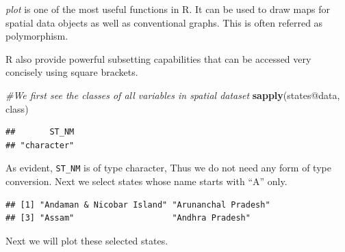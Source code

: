 \documentclass[]{article}
\newenvironment{Shaded}{}{}
\newcommand{\CommentTok}[1]{\textcolor[rgb]{0.38,0.63,0.69}{\textit{#1}}}
\newcommand{\KeywordTok}[1]{\textcolor[rgb]{0.00,0.44,0.13}{\textbf{#1}}}
\newcommand{\NormalTok}[1]{#1}
\newcommand{\OperatorTok}[1]{\textcolor[rgb]{0.40,0.40,0.40}{#1}}
\newcommand{\StringTok}[1]{\textcolor[rgb]{0.25,0.44,0.63}{#1}}
\begin{document}
\emph{plot} is one of the most useful functions in R. It can be used to
draw maps for spatial data objects as well as conventional graphs. This
is often referred as polymorphism.

R also provide powerful subsetting capabilities that can be accessed
very concisely using square brackets.

\begin{Shaded}
\begin{Highlighting}[]
\CommentTok{#We first see the classes of all variables in spatial dataset}
\KeywordTok{sapply}\NormalTok{(states}\OperatorTok{@}\NormalTok{data, class)}
\end{Highlighting}
\end{Shaded}

\begin{verbatim}
##       ST_NM 
## "character"
\end{verbatim}

As evident, \texttt{ST\_NM} is of type character, Thus we do not need
any form of type conversion. Next we select states whose name starts
with ``A'' only.

\begin{Shaded}
\end{Shaded}

\begin{verbatim}
## [1] "Andaman & Nicobar Island" "Arunanchal Pradesh"      
## [3] "Assam"                    "Andhra Pradesh"
\end{verbatim}

Next we will plot these selected states.

\begin{Shaded}
\end{Shaded}
\end{document}

